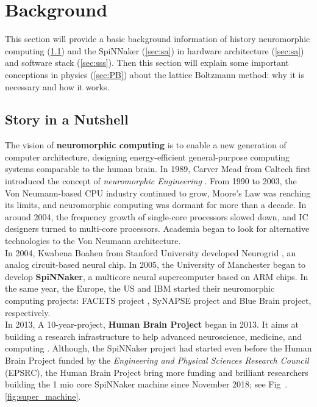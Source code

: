 \section{Background} \label{sec:bg}


This section will provide a basic background information of history neuromorphic computing (\ref{sec:sb}) and the SpiNNaker (\ref{sec:sa}) in hardware architecture (\ref{sec:sa}) and software stack (\ref{sec:sss}). Then this section will explain some important conceptions in physics (\ref{sec:PB}) about the lattice Boltzmann method: why it is necessary and how it works. 


\subsection{Story in a Nutshell} \label{sec:sb}
The vision of \textbf{neuromorphic computing}\cite{mead1980introduction} is to enable a new generation of computer architecture, designing energy-efficient general-purpose computing systems comparable to the human brain. In 1989, Carver Mead from Caltech first introduced the concept of \textit{neuromorphic Engineering} \cite{mead1980introduction}. From 1990 to 2003, the Von Neumann-based CPU industry continued to grow, Moore's Law \cite{schaller1997moore} was reaching its limits, and neuromorphic computing was dormant for more than a decade. In around 2004, the frequency growth of single-core processors slowed down, and IC designers turned to multi-core processors. Academia began to look for alternative technologies to the Von Neumann architecture.\\

In 2004, Kwabena Boahen from Stanford University developed Neurogrid \cite{benjamin2014neurogrid}, an analog circuit-based neural chip. In 2005, the University of Manchester began to develop \textbf{SpiNNaker}, a multicore neural supercomputer based on ARM chips. In the same year, the Europe, the US and IBM started their neuromorphic computing projects: FACETS project \cite{meier2004fast}, SyNAPSE project\cite{park2014impact} and Blue Brain project\cite{gara2005overview}, respectively. \\

In 2013, A 10-year-project, \textbf{Human Brain Project} began in 2013. It aims at building a research infrastructure to help advanced neuroscience, medicine, and computing \cite{hbp}. Although, the SpiNNaker project had started even before the Human Brain Project funded by the \textit{Engineering and Physical Sciences Research Council} (EPSRC), the Human Brain Project bring more funding and brilliant researchers building the 1 mio core SpiNNaker machine since November 2018; see Fig~.\ref{fig:super_machine}.

